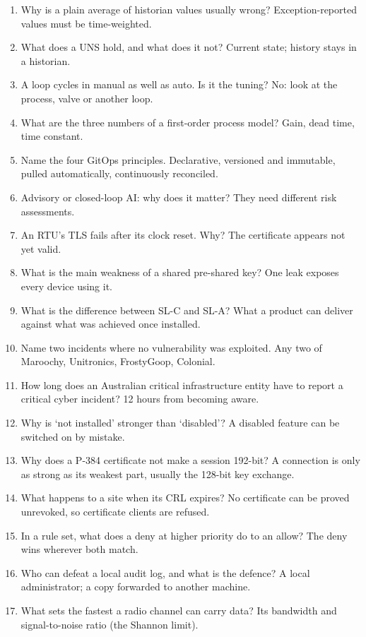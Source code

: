 \begin{enumerate}
\item Why is a plain average of historian values usually wrong? Exception-reported values must be time-weighted.
\item What does a UNS hold, and what does it not? Current state; history stays in a historian.
\item A loop cycles in manual as well as auto. Is it the tuning? No: look at the process, valve or another loop.
\item What are the three numbers of a first-order process model? Gain, dead time, time constant.
\item Name the four GitOps principles. Declarative, versioned and immutable, pulled automatically, continuously reconciled.
\item Advisory or closed-loop AI: why does it matter? They need different risk assessments.
\item An RTU's TLS fails after its clock reset. Why? The certificate appears not yet valid.
\item What is the main weakness of a shared pre-shared key? One leak exposes every device using it.
\item What is the difference between SL-C and SL-A? What a product can deliver against what was achieved once installed.
\item Name two incidents where no vulnerability was exploited. Any two of Maroochy, Unitronics, FrostyGoop, Colonial.
\item How long does an Australian critical infrastructure entity have to report a critical cyber incident? 12 hours from becoming aware.
\item Why is ‘not installed’ stronger than ‘disabled’? A disabled feature can be switched on by mistake.
\item Why does a P-384 certificate not make a session 192-bit? A connection is only as strong as its weakest part, usually the 128-bit key exchange.
\item What happens to a site when its CRL expires? No certificate can be proved unrevoked, so certificate clients are refused.
\item In a rule set, what does a deny at higher priority do to an allow? The deny wins wherever both match.
\item Who can defeat a local audit log, and what is the defence? A local administrator; a copy forwarded to another machine.
\item What sets the fastest a radio channel can carry data? Its bandwidth and signal-to-noise ratio (the Shannon limit).

\end{enumerate}
